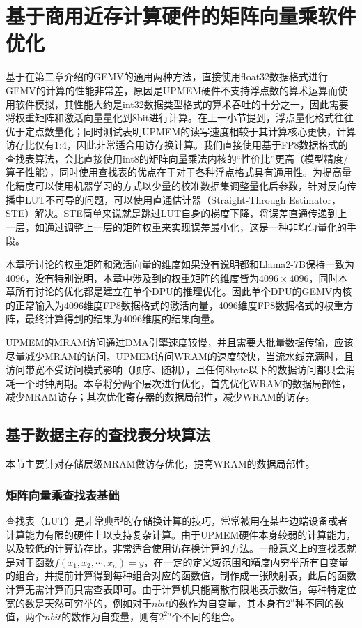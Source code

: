 \chapter{基于商用近存计算硬件的矩阵向量乘软件优化}
基于在第二章介绍的GEMV的通用两种方法，直接使用float32数据格式进行GEMV的计算的性能非常差，原因是UPMEM硬件不支持浮点数的算术运算而使用软件模拟，其性能大约是int32数据类型格式的算术吞吐的十分之一\cite{BenchmarkingMutlu}，因此需要将权重矩阵和激活向量量化到8bit进行计算。在上一小节提到，浮点量化格式往往优于定点数量化\cite{ZeroQuantFP}；同时测试表明UPMEM的读写速度相较于其计算核心更快，计算访存比仅有1:4\cite{BenchmarkingMutlu}，因此非常适合用访存换计算。我们直接使用基于FP8数据格式\cite{FP8}的查找表算法，会比直接使用int8的矩阵向量乘法内核的“性价比”更高（模型精度/算子性能），同时使用查找表的优点在于对于各种浮点格式具有通用性。为提高量化精度可以使用机器学习的方式以少量的校准数据集调整量化后参数，针对反向传播中LUT不可导的问题，可以使用直通估计器（Straight-Through Estimator，STE）解决\cite{NonuniformQuant}。STE简单来说就是跳过LUT自身的梯度下降，将误差直通传递到上一层，如通过调整上一层的矩阵权重来实现误差最小化，这是一种非均匀量化的手段。

本章所讨论的权重矩阵和激活向量的维度如果没有说明都和Llama2-7B保持一致为4096，没有特别说明，本章中涉及到的权重矩阵的维度皆为$4096\times 4096$，同时本章所有讨论的优化都是建立在单个DPU的推理优化。因此单个DPU的GEMV内核的正常输入为4096维度FP8数据格式的激活向量，4096维度FP8数据格式的权重方阵，最终计算得到的结果为4096维度的结果向量。

UPMEM的MRAM访问通过DMA引擎速度较慢，并且需要大批量数据传输，应该尽量减少MRAM的访问。UPMEM访问WRAM的速度较快，当流水线充满时，且访问带宽不受访问模式影响（顺序、随机），且任何8byte以下的数据访问都只会消耗一个时钟周期。本章将分两个层次进行优化，首先优化WRAM的数据局部性，减少MRAM访存；其次优化寄存器的数据局部性，减少WRAM的访存。

\section{基于数据主存的查找表分块算法}
本节主要针对存储层级MRAM做访存优化，提高WRAM的数据局部性。

\subsection{矩阵向量乘查找表基础}
查找表（LUT）是非常典型的存储换计算的技巧，常常被用在某些边端设备或者计算能力有限的硬件上以支持复杂计算。由于UPMEM硬件本身较弱的计算能力，以及较低的计算访存比，非常适合使用访存换计算的方法。一般意义上的查找表就是对于函数$f(x_1,x_2,\cdots,x_n)=y$，在一定的定义域范围和精度内穷举所有自变量的组合，并提前计算得到每种组合对应的函数值，制作成一张映射表，此后的函数计算无需计算而只需查表即可。由于计算机只能离散有限地表示数值，每种特定位宽的数是天然可穷举的，例如对于$n bit$的数作为自变量，其本身有$2^n$种不同的数值，两个$n bit$的数作为自变量，则有$2^{2n}$个不同的组合。

